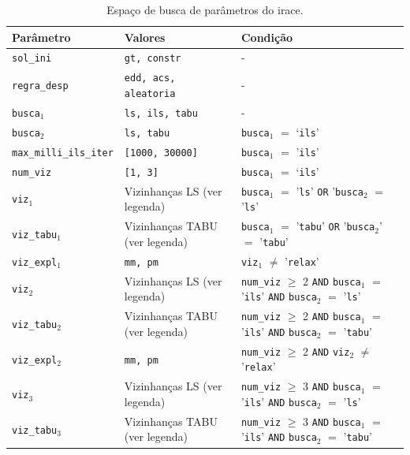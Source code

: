 \begin{table}[h!]
\centering
\caption{Espaço de busca de parâmetros do irace.}
\label{tab:irace_parameters}
\begin{tabularx}{\textwidth}{l >{\raggedright\arraybackslash}X X}
\hline
\textbf{Parâmetro} & \textbf{Valores} & \textbf{Condição} \\ \hline
\texttt{sol\_ini} & \texttt{gt, constr} & - \\ \hline
\texttt{regra\_desp} & \texttt{edd, acs, aleatoria} & - \\ \hline
\texttt{busca$_1$} & \texttt{ls, ils, tabu} & - \\ \hline
\texttt{busca$_2$} & \texttt{ls, tabu} & \texttt{busca$_1$} $=$ `\texttt{ils}' \\ \hline
\texttt{max\_milli\_ils\_iter} & \texttt{[1000, 30000]} & \texttt{busca$_1$} $=$ '\texttt{ils}' \\ \hline
\texttt{num\_viz} & \texttt{[1, 3]} & \texttt{busca$_1$} $=$ `\texttt{ils}' \\ \hline
\texttt{viz$_1$} & Vizinhanças LS (ver legenda) & \texttt{busca$_1$} $=$ '\texttt{ls}' \texttt{OR} '\texttt{busca$_2$} $=$ '\texttt{ls}' \\ \hline
\texttt{viz\_tabu$_1$} & Vizinhanças TABU (ver legenda) & \texttt{busca$_1$} $=$ '\texttt{tabu}' \texttt{OR} '\texttt{busca$_2$}' $=$ '\texttt{tabu}'\\ \hline
\texttt{viz\_expl$_1$} & \texttt{mm, pm} & \texttt{viz}$_1$ $\neq$ '\texttt{relax}' \\ \hline
\texttt{viz$_2$} & Vizinhanças LS (ver legenda) & \texttt{num\_viz} $\geq$ 2 \texttt{AND} \texttt{busca$_1$} $=$ '\texttt{ils}' \texttt{AND} \texttt{busca$_2$} $=$ '\texttt{ls}' \\ \hline
\texttt{viz\_tabu$_2$} & Vizinhanças TABU (ver legenda) & \texttt{num\_viz} $\geq$ 2 \texttt{AND} \texttt{busca$_1$} $=$ '\texttt{ils}' \texttt{AND} \texttt{busca$_2$} $=$ '\texttt{tabu}' \\ \hline
\texttt{viz\_expl$_2$} & \texttt{mm, pm} & \texttt{num\_viz} $\geq$ 2 \texttt{AND} \texttt{viz}$_2$ $\neq$ '\texttt{relax}'\\ \hline
\texttt{viz$_3$} & Vizinhanças LS (ver legenda) & \texttt{num\_viz} $\geq$ 3 \texttt{AND} \texttt{busca$_1$} $=$ '\texttt{ils}' \texttt{AND} \texttt{busca$_2$} $=$ '\texttt{ls}' \\ \hline
\texttt{viz\_tabu$_3$} & Vizinhanças TABU (ver legenda) & \texttt{num\_viz} $\geq$ 3 \texttt{AND} \texttt{busca$_1$} $=$ '\texttt{ils}' \texttt{AND} \texttt{busca$_2$} $=$ '\texttt{tabu}' \\ \hline

\end{tabularx}
\end{table}
